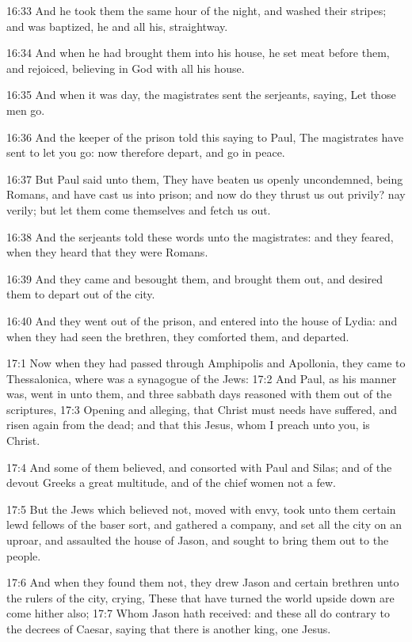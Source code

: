 16:33 And he took them the same hour of the night, and washed their stripes; and was baptized, he and all his, straightway.

16:34 And when he had brought them into his house, he set meat before them, and rejoiced, believing in God with all his house.

16:35 And when it was day, the magistrates sent the serjeants, saying, Let those men go.

16:36 And the keeper of the prison told this saying to Paul, The magistrates have sent to let you go: now therefore depart, and go in peace.

16:37 But Paul said unto them, They have beaten us openly uncondemned, being Romans, and have cast us into prison; and now do they thrust us out privily? nay verily; but let them come themselves and fetch us out.

16:38 And the serjeants told these words unto the magistrates: and they feared, when they heard that they were Romans.

16:39 And they came and besought them, and brought them out, and desired them to depart out of the city.

16:40 And they went out of the prison, and entered into the house of Lydia: and when they had seen the brethren, they comforted them, and departed.

17:1 Now when they had passed through Amphipolis and Apollonia, they came to Thessalonica, where was a synagogue of the Jews: 17:2 And Paul, as his manner was, went in unto them, and three sabbath days reasoned with them out of the scriptures, 17:3 Opening and alleging, that Christ must needs have suffered, and risen again from the dead; and that this Jesus, whom I preach unto you, is Christ.

17:4 And some of them believed, and consorted with Paul and Silas; and of the devout Greeks a great multitude, and of the chief women not a few.

17:5 But the Jews which believed not, moved with envy, took unto them certain lewd fellows of the baser sort, and gathered a company, and set all the city on an uproar, and assaulted the house of Jason, and sought to bring them out to the people.

17:6 And when they found them not, they drew Jason and certain brethren unto the rulers of the city, crying, These that have turned the world upside down are come hither also; 17:7 Whom Jason hath received: and these all do contrary to the decrees of Caesar, saying that there is another king, one Jesus.


